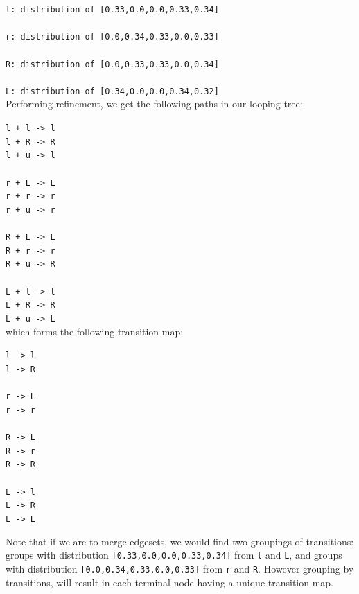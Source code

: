 \documentclass{article}
\begin{document}
{\tt l: distribution of [0.33,0.0,0.0,0.33,0.34]}\\
\\
{\tt r: distribution of [0.0,0.34,0.33,0.0,0.33]}\\
\\
{\tt R: distribution of [0.0,0.33,0.33,0.0,0.34]}\\
\\
{\tt L: distribution of [0.34,0.0,0.0,0.34,0.32]}\\

Performing refinement, we get the following paths in our looping tree:

{\tt l + l -> l}\\
{\tt l + R -> R}\\
{\tt l + u -> l}\\
\\
{\tt r + L -> L}\\
{\tt r + r -> r}\\
{\tt r + u -> r}\\
\\
{\tt R + L -> L}\\
{\tt R + r -> r}\\
{\tt R + u -> R}\\
\\
{\tt L + l -> l}\\
{\tt L + R -> R}\\
{\tt L + u -> L}\\


which forms the following transition map:

{\tt l -> l}\\
{\tt l -> R}\\
\\
{\tt r -> L}\\
{\tt r -> r}\\
\\
{\tt R -> L}\\
{\tt R -> r}\\
{\tt R -> R}\\
\\
{\tt L -> l}\\
{\tt L -> R}\\
{\tt L -> L}\\

\newpage

Note that if we are to merge edgesets, we would find two groupings of
transitions: groups with distribution {\tt [0.33,0.0,0.0,0.33,0.34]} from {\tt l}
and {\tt L}, and groups with distribution {\tt [0.0,0.34,0.33,0.0,0.33]} from
{\tt r} and {\tt R}. However grouping by transitions, will result in each terminal
node having a unique transition map.
\end{document}
